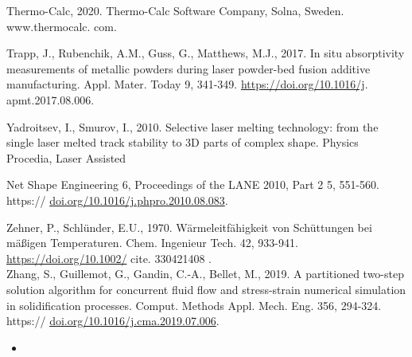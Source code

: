 \documentclass[10pt]{article}
\begin{document}
Thermo-Calc, 2020. Thermo-Calc Software Company, Solna, Sweden. www.thermocalc. com.

Trapp, J., Rubenchik, A.M., Guss, G., Matthews, M.J., 2017. In situ absorptivity measurements of metallic powders during laser powder-bed fusion additive manufacturing. Appl. Mater. Today 9, 341-349. \href{https://doi.org/10.1016/j}{https://doi.org/10.1016/j}. apmt.2017.08.006.

Yadroitsev, I., Smurov, I., 2010. Selective laser melting technology: from the single laser melted track stability to 3D parts of complex shape. Physics Procedia, Laser Assisted

Net Shape Engineering 6, Proceedings of the LANE 2010, Part 2 5, 551-560. https:// \href{http://doi.org/10.1016/j.phpro.2010.08.083}{doi.org/10.1016/j.phpro.2010.08.083}.

Zehner, P., Schlünder, E.U., 1970. Wärmeleitfähigkeit von Schüttungen bei mäßigen Temperaturen. Chem. Ingenieur Tech. 42, 933-941. \href{https://doi.org/10.1002/}{https://doi.org/10.1002/} cite. 330421408 .\\
Zhang, S., Guillemot, G., Gandin, C.-A., Bellet, M., 2019. A partitioned two-step solution algorithm for concurrent fluid flow and stress-strain numerical simulation in solidification processes. Comput. Methods Appl. Mech. Eng. 356, 294-324. https:// \href{http://doi.org/10.1016/j.cma.2019.07.006}{doi.org/10.1016/j.cma.2019.07.006}.

\begin{itemize}
  \item 
\end{itemize}
\end{document}
